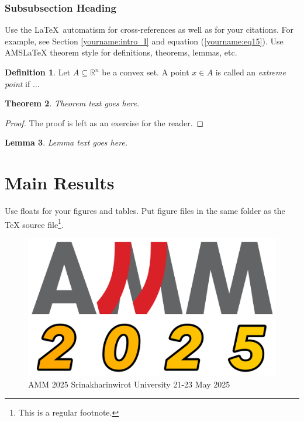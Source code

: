 \documentclass[12pt, a4paper, twoside]{article}
\theoremstyle{plain}
\newtheorem{theorem}{Theorem}[section]
\newtheorem{lemma}[theorem]{Lemma}
\theoremstyle{definition}
\newtheorem{definition}[theorem]{Definition}
\theoremstyle{remark}
\numberwithin{equation}{section}
\begin{document}
\subsubsection{Subsubsection Heading}
Use the \LaTeX\ automatism for cross-references as well as for your citations. For example, see Section \ref{yourname:intro_I} and equation (\ref{yourname:eq15}). Use AMSLaTeX theorem style for definitions, theorems, lemmas, etc. 

\begin{definition}
Let $A \subseteq \mathbb{R}^n$ be a convex set. A point $x \in A$ is called an \emph{extreme point} if $\dots$
\end{definition}

\begin{theorem}
	Theorem text goes here.
\end{theorem}
\begin{proof}
   The proof is left as an exercise for the reader.
\end{proof}

\begin{lemma}
	Lemma text goes here.
\end{lemma}

\section{Main Results}

Use floats for your figures and tables. Put figure files in the same folder as the TeX source file\footnote{This is a regular footnote.}.

\begin{figure}[h]
\centering
\includegraphics[scale=0.1]{amm2025_logo_small_color.png}
\caption{AMM 2025 Srinakharinwirot University 21-23 May 2025}
\label{yourname:ammlogo}
\end{figure}
\end{document}
